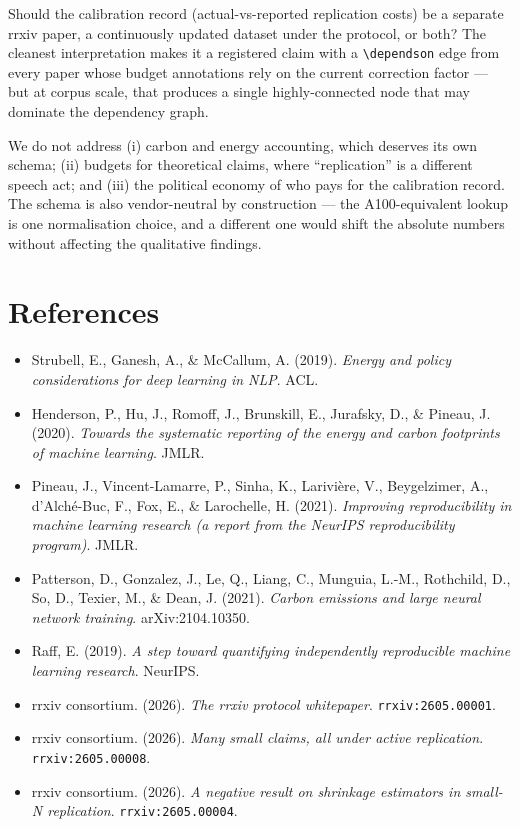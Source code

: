 \documentclass{rrxiv}
\begin{document}
\begin{openquestion}
Should the calibration record (actual-vs-reported replication costs) be a separate rrxiv paper, a continuously updated dataset under the protocol, or both? The cleanest interpretation makes it a registered claim with a \texttt{\textbackslash dependson} edge from every paper whose budget annotations rely on the current correction factor --- but at corpus scale, that produces a single highly-connected node that may dominate the dependency graph.
\end{openquestion}

\begin{scope}
We do not address (i) carbon and energy accounting, which deserves its own schema; (ii) budgets for theoretical claims, where ``replication'' is a different speech act; and (iii) the political economy of who pays for the calibration record. The schema is also vendor-neutral by construction --- the A100-equivalent lookup is one normalisation choice, and a different one would shift the absolute numbers without affecting the qualitative findings.
\end{scope}

\section{References}
\begin{itemize}[leftmargin=*]
\item Strubell, E., Ganesh, A., \& McCallum, A. (2019). \emph{Energy and policy considerations for deep learning in NLP}. ACL.
\item Henderson, P., Hu, J., Romoff, J., Brunskill, E., Jurafsky, D., \& Pineau, J. (2020). \emph{Towards the systematic reporting of the energy and carbon footprints of machine learning}. JMLR.
\item Pineau, J., Vincent-Lamarre, P., Sinha, K., Larivi\`ere, V., Beygelzimer, A., d'Alch\'e-Buc, F., Fox, E., \& Larochelle, H. (2021). \emph{Improving reproducibility in machine learning research (a report from the NeurIPS reproducibility program)}. JMLR.
\item Patterson, D., Gonzalez, J., Le, Q., Liang, C., Munguia, L.-M., Rothchild, D., So, D., Texier, M., \& Dean, J. (2021). \emph{Carbon emissions and large neural network training}. arXiv:2104.10350.
\item Raff, E. (2019). \emph{A step toward quantifying independently reproducible machine learning research}. NeurIPS.
\item rrxiv consortium. (2026). \emph{The rrxiv protocol whitepaper}. \texttt{rrxiv:2605.00001}.
\item rrxiv consortium. (2026). \emph{Many small claims, all under active replication}. \texttt{rrxiv:2605.00008}.
\item rrxiv consortium. (2026). \emph{A negative result on shrinkage estimators in small-N replication}. \texttt{rrxiv:2605.00004}.
\end{itemize}
\end{document}
